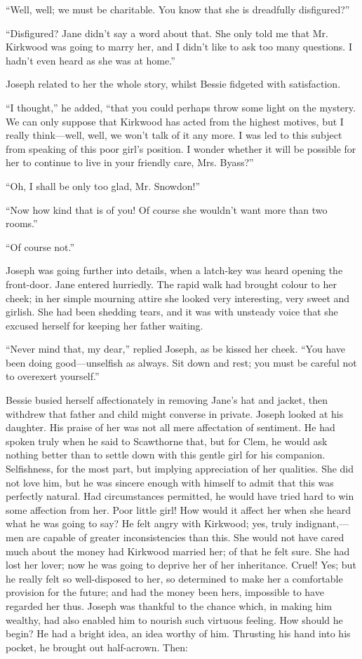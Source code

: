 ``Well, well; we must be charitable. You know that she is dreadfully
disfigured?''

``Disfigured? Jane didn't say a word about that. She only told me that
Mr. Kirkwood was going to marry her, and I didn't like to ask too many
questions. I hadn't even heard as she was at home.''

Joseph related to her the whole story, whilst Bessie fidgeted with
satisfaction.

``I thought,'' he added, ``that you could
{\protect\hypertarget{226}{}{}}perhaps throw some light on the mystery.
We can only suppose that Kirkwood has acted from the highest motives,
but I really think---well, well, we won't talk of it any more. I was led
to this subject from speaking of this poor girl's position. I wonder
whether it will be possible for her to continue to live in your friendly
care, Mrs. Byass?''

``Oh, I shall be only too glad, Mr. Snowdon!''

``Now how kind that is of you! Of course she wouldn't want more than two
rooms.''

``Of course not.''

Joseph was going further into details, when a latch-key was heard
opening the front-door. Jane entered hurriedly. The rapid walk had
brought colour to her cheek; in her simple mourning attire she looked
very interesting, very sweet and girlish. She had been shedding tears,
and it was with unsteady voice that she excused herself for keeping her
father waiting.

``Never mind that, my dear,'' replied Joseph, as be kissed her cheek.
``You have been doing good---unselfish as always. Sit down and rest; you
must be careful not to overexert yourself.''

{\protect\hypertarget{227}{}{}}Bessie busied herself affectionately in
removing Jane's hat and jacket, then withdrew that father and child
might converse in private. Joseph looked at his daughter. His praise of
her was not all mere affectation of sentiment. He had spoken truly when
he said to Scawthorne that, but for Clem, he would ask nothing better
than to settle down with this gentle girl for his companion.
Selfishness, for the most part, but implying appreciation of her
qualities. She did not love him, but he was sincere enough with himself
to admit that this was perfectly natural. Had circumstances permitted,
he would have tried hard to win some affection from her. Poor little
girl! How would it affect her when she heard what he was going to say?
He felt angry with Kirkwood; yes, truly indignant,---men are capable of
greater inconsistencies than this. She would not have cared much about
the money had Kirkwood married her; of that he felt sure. She had lost
her lover; now he was going to deprive her of her inheritance. Cruel!
Yes; but he really felt so well-disposed to her, so determined to make
her a comfortable provision for the future; and had the
{\protect\hypertarget{228}{}{}}money been hers, impossible to have
regarded her thus. Joseph was thankful to the chance which, in making
him wealthy, had also enabled him to nourish such virtuous feeling. How
should he begin? He had a bright idea, an idea worthy of him. Thrusting
his hand into his pocket, he brought out half-acrown. Then:

